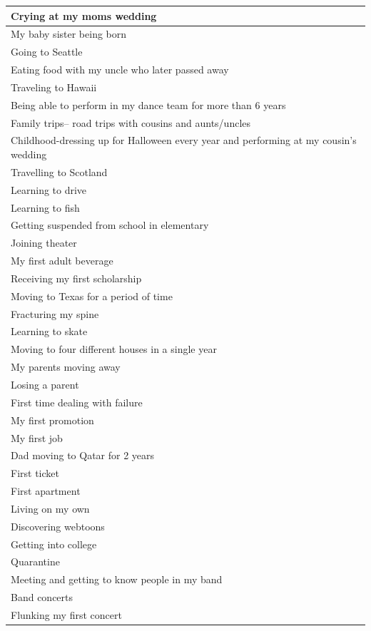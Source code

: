 \documentclass[
  .7em,
  letterpaper,
  DIV=11,
  numbers=noendperiod]{scrartcl}
\begin{document}
\begin{table}
\begin{tabular}{l}
\hline
Crying at my moms wedding\\
\hline
My baby sister being born\\
\hline
Going to Seattle\\
\hline
Eating food with my uncle who later passed away\\
\hline
Traveling to Hawaii\\
\hline
Being able to perform in my dance team for more than 6 years\\
\hline
Family trips-- road trips with cousins and aunts/uncles\\
\hline
Childhood-dressing up for Halloween every year and performing at my cousin's wedding\\
\hline
Travelling to Scotland\\
\hline
Learning to drive\\
\hline
Learning to fish\\
\hline
Getting suspended from school in elementary\\
\hline
Joining theater\\
\hline
My first adult beverage\\
\hline
Receiving my first scholarship\\
\hline
Moving to Texas for a period of time\\
\hline
Fracturing my spine\\
\hline
Learning to skate\\
\hline
Moving to four different houses in a single year\\
\hline
My parents moving away\\
\hline
Losing a parent\\
\hline
First time dealing with failure\\
\hline
My first promotion\\
\hline
My first job\\
\hline
Dad moving to Qatar for 2 years\\
\hline
First ticket\\
\hline
First apartment\\
\hline
Living on my own\\
\hline
Discovering webtoons\\
\hline
Getting into college\\
\hline
Quarantine\\
\hline
Meeting and getting to know people in my band\\
\hline
Band concerts\\
\hline
Flunking my first concert\\

\end{tabular}
\end{table}
\end{document}
